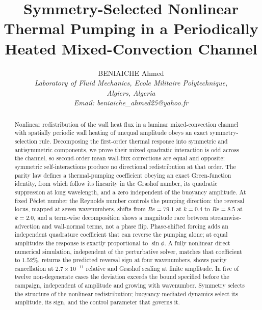 \documentclass[12pt,a4paper]{article}
\newcommand{\Rey}{\mathit{Re}}
\begin{document}
\title{\textbf{Symmetry-Selected Nonlinear Thermal Pumping in a Periodically Heated Mixed-Convection Channel}}
\author{BENIAICHE Ahmed \\
\textit{Laboratory of Fluid Mechanics, Ecole Militaire Polytechnique,} \\
\textit{Algiers, Algeria} \\
\textit{Email: beniaiche\_ahmed25@yahoo.fr}}
\date{}
\maketitle

\begin{abstract}
Nonlinear redistribution of the wall heat flux in a laminar mixed-convection
channel with spatially periodic wall heating of unequal amplitude obeys an exact
symmetry-selection rule. Decomposing the first-order thermal response into
symmetric and antisymmetric components, we prove their mixed quadratic
interaction is odd across the channel, so second-order mean wall-flux
corrections are equal and opposite; symmetric self-interactions produce no
directional redistribution at that order. The parity law defines a
thermal-pumping coefficient obeying an exact Green-function identity, from which
follow its linearity in the Grashof number, its quadratic suppression at long
wavelength, and a zero independent of the buoyancy amplitude. At fixed P\'eclet
number the Reynolds number controls the pumping direction: the reversal locus,
mapped at seven wavenumbers, shifts from $\Rey=79.1$ at $k=0.4$ to $\Rey=8.5$ at
$k=2.0$, and a term-wise decomposition shows a magnitude race between
streamwise-advection and wall-normal terms, not a phase flip.
Phase-shifted forcing adds an independent quadrature coefficient that can
reverse the pumping alone; at equal amplitudes the response is
exactly proportional to $\sin\phi$. A fully nonlinear direct numerical
simulation, independent of the perturbative solver, matches that coefficient to
$1.52\%$, returns the predicted reversal sign at four wavenumbers,
shows parity cancellation at $2.7\times10^{-11}$ relative and Grashof scaling at
finite amplitude. In five of twelve non-degenerate cases the deviation exceeds
the bound specified before the campaign, independent of amplitude and growing
with wavenumber. Symmetry selects the structure of the nonlinear
redistribution; buoyancy-mediated dynamics select its amplitude, its sign, and
the control parameter that governs it.
\end{abstract}
\end{document}

